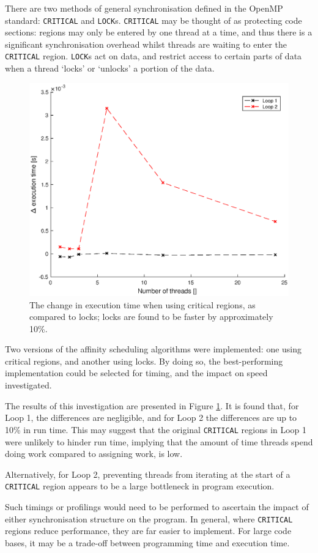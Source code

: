 \documentclass{article} %
\newcommand{\tp}{\texttt}
\begin{document}
There are two methods of general synchronisation defined in the OpenMP standard: \tp{CRITICAL} and \tp{LOCK}s. 
\tp{CRITICAL} may be thought of as protecting code sections: regions may only be entered by one thread at a time, and thus there is a significant synchronisation overhead whilst threads are waiting to enter the \tp{CRITICAL} region.
\tp{LOCK}s act on data, and restrict access to certain parts of data when a thread `locks' or `unlocks' a portion of the data.


\begin{figure}
    \centering
    \includegraphics[width=.8\textwidth]{part2_plots/criticalvslock}
    \caption{The change in execution time when using critical regions, as compared to locks; locks are found to be faster by approximately 10\%.}
    \label{fig:criticalvslock}
\end{figure}

Two versions of the affinity scheduling algorithms were implemented: one using critical regions, and another using locks.
By doing so, the best-performing implementation could be selected for timing, and the impact on speed investigated.

The results of this investigation are presented in Figure \ref{fig:criticalvslock}. 
It is found that, for Loop 1, the differences are negligible, and for Loop 2 the differences are up to 10\% in run time.
This may suggest that the original \tp{CRITICAL} regions in Loop 1 were unlikely to hinder run time, implying that the amount of time threads spend doing work compared to assigning work, is low.

Alternatively, for Loop 2, preventing threads from iterating at the start of a \tp{CRITICAL} region appears to be a large bottleneck in program execution.

Such timings or profilings would need to be performed to ascertain the impact of either synchronisation structure on the program.
In general, where \tp{CRITICAL} regions reduce performance, they are far easier to implement.
For large code bases, it may be a trade-off between programming time and execution time.



\newpage

\end{document}
